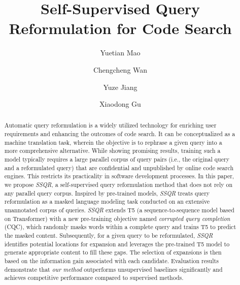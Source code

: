 \documentclass[sigconf,screen]{acmart}
\newcommand{\ie}{\hbox{i.e.}\xspace}
\newcommand{\ourmethod}{\textit{SSQR}\xspace}
\begin{document}
\title{Self-Supervised Query Reformulation for Code Search}

\author{Yuetian Mao}

\author{Chengcheng Wan}
\authornotemark[1]

\author{Yuze Jiang}

\author{Xiaodong Gu}


\begin{abstract}
Automatic query reformulation is a widely utilized technology for enriching user requirements and enhancing the outcomes of code search. It can be conceptualized as a machine translation task, wherein the objective is to rephrase a given query into a more comprehensive alternative. While showing promising results, training such a model typically requires a large parallel corpus of query pairs (\ie, the original query and a reformulated query) that are confidential and unpublished by online code search engines. This restricts its practicality in software development processes. In this paper, we propose \ourmethod, a self-supervised query reformulation method that does not rely on any parallel query corpus. Inspired by pre-trained models, \ourmethod treats query reformulation as a masked language modeling task conducted on an extensive unannotated corpus of queries. \ourmethod extends T5 (a sequence-to-sequence model based on Transformer) with a new pre-training objective named \textit{corrupted query completion} (CQC), which randomly masks words within a complete query and trains T5 to predict the masked content. Subsequently, for a given query to be reformulated, \ourmethod identifies potential locations for expansion and leverages the pre-trained T5 model to generate appropriate content to fill these gaps. The selection of expansions is then based on the information gain associated with each candidate. Evaluation results demonstrate that \textit{our method} outperforms unsupervised baselines significantly and achieves competitive performance compared to supervised methods.
\end{abstract}
\end{document}
